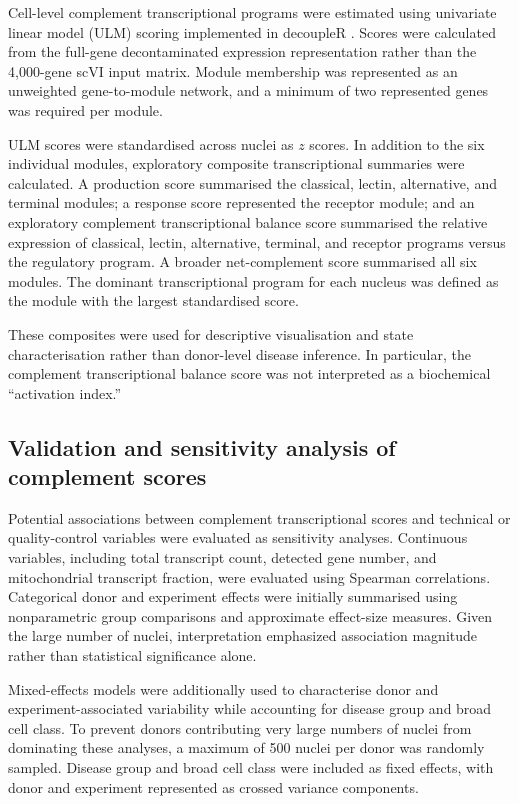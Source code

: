 \documentclass[10pt,letterpaper]{article}
\begin{document}
Cell-level complement transcriptional programs were estimated using univariate linear model (ULM) scoring implemented in decoupleR \cite{Badia-i-Mompel2022}. Scores were calculated from the full-gene decontaminated expression representation rather than the 4,000-gene scVI input matrix. Module membership was represented as an unweighted gene-to-module network, and a minimum of two represented genes was required per module.

ULM scores were standardised across nuclei as $z$ scores. In addition to the six individual modules, exploratory composite transcriptional summaries were calculated. A production score summarised the classical, lectin, alternative, and terminal modules; a response score represented the receptor module; and an exploratory complement transcriptional balance score summarised the relative expression of classical, lectin, alternative, terminal, and receptor programs versus the regulatory program. A broader net-complement score summarised all six modules. The dominant transcriptional program for each nucleus was defined as the module with the largest standardised score.

These composites were used for descriptive visualisation and state characterisation rather than donor-level disease inference. In particular, the complement transcriptional balance score was not interpreted as a biochemical ``activation index.''

\subsection*{Validation and sensitivity analysis of complement scores}

Potential associations between complement transcriptional scores and technical or quality-control variables were evaluated as sensitivity analyses. Continuous variables, including total transcript count, detected gene number, and mitochondrial transcript fraction, were evaluated using Spearman correlations. Categorical donor and experiment effects were initially summarised using nonparametric group comparisons and approximate effect-size measures. Given the large number of nuclei, interpretation emphasized association magnitude rather than statistical significance alone.

Mixed-effects models were additionally used to characterise donor and experiment-associated variability while accounting for disease group and broad cell class. To prevent donors contributing very large numbers of nuclei from dominating these analyses, a maximum of 500 nuclei per donor was randomly sampled. Disease group and broad cell class were included as fixed effects, with donor and experiment represented as crossed variance components.
\end{document}
